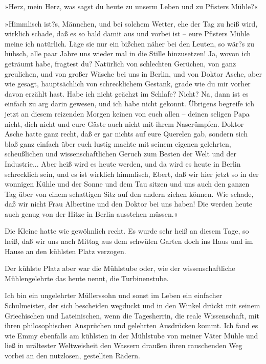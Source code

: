 »Herz, mein Herz, was sagst du heute zu unserm Leben und zu
Pfisters Mühle?«

»Himmlisch ist?s, Männchen, und bei solchem Wetter, ehe der Tag zu
heiß wird, wirklich schade, daß es so bald damit aus und vorbei ist
– eure Pfisters Mühle meine ich natürlich. Läge sie nur ein bißchen
näher bei den Leuten, so wär?s zu hübsch, alle paar Jahre uns
wieder mal in die Stille hinzusetzen! Ja, wovon ich geträumt habe,
fragtest du? Natürlich von schlechten Gerüchen, von ganz
greulichen, und von großer Wäsche bei uns in Berlin, und von Doktor
Asche, aber wie gesagt, hauptsächlich von schrecklichem Gestank,
grade wie du mir vorher davon erzählt hast. Habe ich nicht geächzt
im Schlafe? Nicht? Na, dann ist es einfach zu arg darin gewesen,
und ich habe nicht gekonnt. Übrigens begreife ich jetzt an diesem
reizenden Morgen keinen von euch allen – deinen seligen Papa nicht,
dich nicht und eure Gäste auch nicht mit ihrem Naserümpfen. Doktor
Asche hatte ganz recht, daß er gar nichts auf eure Querelen gab,
sondern sich bloß ganz einfach über euch lustig machte mit seinem
eigenen gelehrten, scheußlichen und wissenschaftlichen Geruch zum
Besten der Welt und der Industrie... Aber heiß wird es heute
werden, und da wird es heute in Berlin schrecklich sein, und es ist
wirklich himmlisch, Ebert, daß wir hier jetzt so in der wonnigen
Kühle und der Sonne und dem Tau sitzen und uns auch den ganzen Tag
über von einem schattigen Sitz auf den andern ziehen können. Wie
schade, daß wir nicht Frau Albertine und den Doktor bei uns haben!
Die werden heute auch genug von der Hitze in Berlin ausstehen
müssen.«

Die Kleine hatte wie gewöhnlich recht. Es wurde sehr heiß an diesem
Tage, so heiß, daß wir uns nach Mittag aus dem schwülen Garten doch
ins Haus und im Hause an den kühlsten Platz verzogen.

Der kühlste Platz aber war die Mühlstube oder, wie der
wissenschaftliche Mühlengelehrte das heute nennt, die
Turbinenstube.

Ich bin ein ungelehrter Müllerssohn und sonst im Leben ein
einfacher Schulmeister, der sich bescheiden wegduckt und in den
Winkel drückt mit seinem Griechischen und Lateinischen, wenn die
Tagesherrin, die reale Wissenschaft, mit ihren philosophischen
Ansprüchen und gelehrten Ausdrücken kommt. Ich fand es wie Emmy
ebenfalls am kühlsten in der Mühlstube von meiner Väter Mühle und
ließ in urältester Weltweisheit den Wassern draußen ihren
rauschenden Weg vorbei an den nutzlosen, gestellten Rädern.

